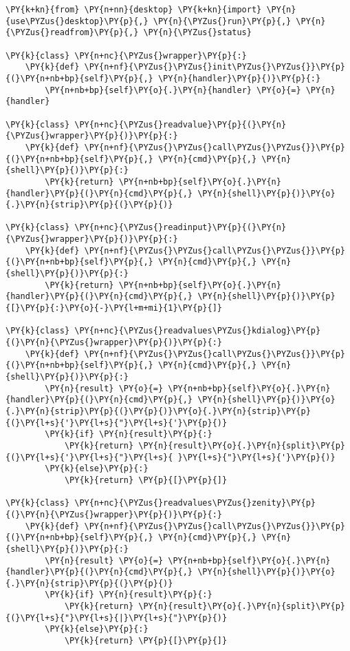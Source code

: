 \begin{Verbatim}[commandchars=\\\{\}]
\PY{k+kn}{from} \PY{n+nn}{desktop} \PY{k+kn}{import} \PY{n}{use\PYZus{}desktop}\PY{p}{,} \PY{n}{\PYZus{}run}\PY{p}{,} \PY{n}{\PYZus{}readfrom}\PY{p}{,} \PY{n}{\PYZus{}status}

\PY{k}{class} \PY{n+nc}{\PYZus{}wrapper}\PY{p}{:}
    \PY{k}{def} \PY{n+nf}{\PYZus{}\PYZus{}init\PYZus{}\PYZus{}}\PY{p}{(}\PY{n+nb+bp}{self}\PY{p}{,} \PY{n}{handler}\PY{p}{)}\PY{p}{:}
        \PY{n+nb+bp}{self}\PY{o}{.}\PY{n}{handler} \PY{o}{=} \PY{n}{handler}

\PY{k}{class} \PY{n+nc}{\PYZus{}readvalue}\PY{p}{(}\PY{n}{\PYZus{}wrapper}\PY{p}{)}\PY{p}{:}
    \PY{k}{def} \PY{n+nf}{\PYZus{}\PYZus{}call\PYZus{}\PYZus{}}\PY{p}{(}\PY{n+nb+bp}{self}\PY{p}{,} \PY{n}{cmd}\PY{p}{,} \PY{n}{shell}\PY{p}{)}\PY{p}{:}
        \PY{k}{return} \PY{n+nb+bp}{self}\PY{o}{.}\PY{n}{handler}\PY{p}{(}\PY{n}{cmd}\PY{p}{,} \PY{n}{shell}\PY{p}{)}\PY{o}{.}\PY{n}{strip}\PY{p}{(}\PY{p}{)}

\PY{k}{class} \PY{n+nc}{\PYZus{}readinput}\PY{p}{(}\PY{n}{\PYZus{}wrapper}\PY{p}{)}\PY{p}{:}
    \PY{k}{def} \PY{n+nf}{\PYZus{}\PYZus{}call\PYZus{}\PYZus{}}\PY{p}{(}\PY{n+nb+bp}{self}\PY{p}{,} \PY{n}{cmd}\PY{p}{,} \PY{n}{shell}\PY{p}{)}\PY{p}{:}
        \PY{k}{return} \PY{n+nb+bp}{self}\PY{o}{.}\PY{n}{handler}\PY{p}{(}\PY{n}{cmd}\PY{p}{,} \PY{n}{shell}\PY{p}{)}\PY{p}{[}\PY{p}{:}\PY{o}{-}\PY{l+m+mi}{1}\PY{p}{]}

\PY{k}{class} \PY{n+nc}{\PYZus{}readvalues\PYZus{}kdialog}\PY{p}{(}\PY{n}{\PYZus{}wrapper}\PY{p}{)}\PY{p}{:}
    \PY{k}{def} \PY{n+nf}{\PYZus{}\PYZus{}call\PYZus{}\PYZus{}}\PY{p}{(}\PY{n+nb+bp}{self}\PY{p}{,} \PY{n}{cmd}\PY{p}{,} \PY{n}{shell}\PY{p}{)}\PY{p}{:}
        \PY{n}{result} \PY{o}{=} \PY{n+nb+bp}{self}\PY{o}{.}\PY{n}{handler}\PY{p}{(}\PY{n}{cmd}\PY{p}{,} \PY{n}{shell}\PY{p}{)}\PY{o}{.}\PY{n}{strip}\PY{p}{(}\PY{p}{)}\PY{o}{.}\PY{n}{strip}\PY{p}{(}\PY{l+s}{'}\PY{l+s}{"}\PY{l+s}{'}\PY{p}{)}
        \PY{k}{if} \PY{n}{result}\PY{p}{:}
            \PY{k}{return} \PY{n}{result}\PY{o}{.}\PY{n}{split}\PY{p}{(}\PY{l+s}{'}\PY{l+s}{"}\PY{l+s}{ }\PY{l+s}{"}\PY{l+s}{'}\PY{p}{)}
        \PY{k}{else}\PY{p}{:}
            \PY{k}{return} \PY{p}{[}\PY{p}{]}

\PY{k}{class} \PY{n+nc}{\PYZus{}readvalues\PYZus{}zenity}\PY{p}{(}\PY{n}{\PYZus{}wrapper}\PY{p}{)}\PY{p}{:}
    \PY{k}{def} \PY{n+nf}{\PYZus{}\PYZus{}call\PYZus{}\PYZus{}}\PY{p}{(}\PY{n+nb+bp}{self}\PY{p}{,} \PY{n}{cmd}\PY{p}{,} \PY{n}{shell}\PY{p}{)}\PY{p}{:}
        \PY{n}{result} \PY{o}{=} \PY{n+nb+bp}{self}\PY{o}{.}\PY{n}{handler}\PY{p}{(}\PY{n}{cmd}\PY{p}{,} \PY{n}{shell}\PY{p}{)}\PY{o}{.}\PY{n}{strip}\PY{p}{(}\PY{p}{)}
        \PY{k}{if} \PY{n}{result}\PY{p}{:}
            \PY{k}{return} \PY{n}{result}\PY{o}{.}\PY{n}{split}\PY{p}{(}\PY{l+s}{"}\PY{l+s}{|}\PY{l+s}{"}\PY{p}{)}
        \PY{k}{else}\PY{p}{:}
            \PY{k}{return} \PY{p}{[}\PY{p}{]}


\end{Verbatim}
